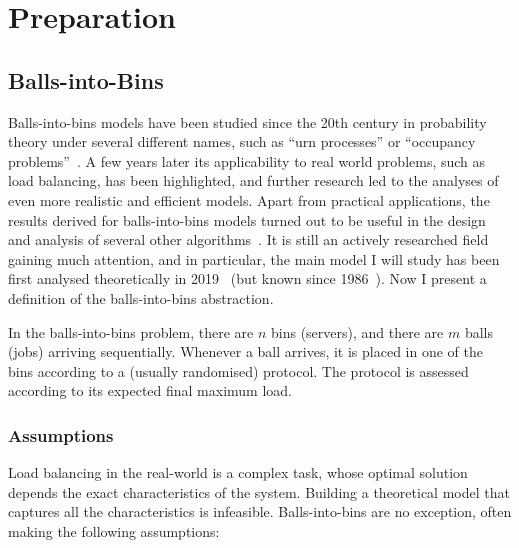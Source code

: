 \chapter{Preparation}\label{preparation}

\ifpdf
    \graphicspath{{Chapter2/Figs/Raster/}{Chapter2/Figs/PDF/}{Chapter2/Figs/}}
\else
    \graphicspath{{Chapter2/Figs/Vector/}{Chapter2/Figs/}}
\fi



\section{Balls-into-Bins}


Balls-into-bins models have been studied since the 20th century in probability theory under several different names, such as ``urn processes'' or ``occupancy problems''~\cite{kolchin1978coined}. A few years later its applicability to real world problems, such as load balancing, has been highlighted, and further research led to the analyses of even more realistic and efficient models. Apart from practical applications, the results derived for balls-into-bins models turned out to be useful in the design and analysis of several other algorithms~\cite{edmonds2006cakecutting}. It is still an actively researched field gaining much attention, and in particular, the main model I will study has been first analysed theoretically in 2019~\cite{dwivedi2019firstthinning} (but known since 1986~\cite{derek1986twothinningfirstattempt}). Now I present a definition of the balls-into-bins abstraction.



\begin{definition} \label{definition: balls-into-bins}
In the balls-into-bins problem, there are $n$ bins (servers), and there are $m$ balls (jobs) arriving sequentially. Whenever a ball arrives, it is placed in one of the bins according to a (usually randomised) protocol. The protocol is assessed according to its expected final maximum load.
\end{definition}



\subsection{Assumptions} \label{assumptions}



Load balancing in the real-world is a complex task, whose optimal solution depends the exact characteristics of the system. Building a theoretical model that captures all the characteristics is infeasible. Balls-into-bins are no exception, often making the following assumptions:


